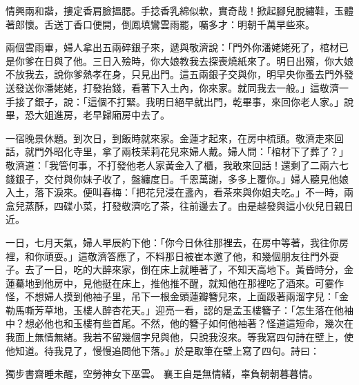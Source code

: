 情興兩和諧，摟定香肩臉搵腮。手捻香乳綿似軟，實奇哉！掀起腳兒脫繡鞋，玉體著郎懷。舌送丁香口便開，倒鳳填鸞雲雨罷，囑多才：明朝千萬早些來。

兩個雲雨畢，婦人拿出五兩碎銀子來，遞與敬濟說：「門外你潘姥姥死了，棺材已是你爹在日與了他。三日入殮時，你大娘教我去探喪燒紙來了。明日出殯，你大娘不放我去，說你爹熱孝在身，只見出門。這五兩銀子交與你，明早央你蚤去門外發送發送你潘姥姥，打發抬錢，看著下入土內，你來家。就同我去一般。」這敬濟一手接了銀子，說：「這個不打緊。我明日絕早就出門，乾畢事，來回你老人家。」說畢，恐大姐進房，老早歸廂房中去了。

一宿晚景休題。到次日，到飯時就來家。金蓮才起來，在房中梳頭。敬濟走來回話，就門外昭化寺里，拿了兩枝茉莉花兒來婦人戴。婦人問：「棺材下了葬了？」敬濟道：「我管何事，不打發他老人家黃金入了櫃，我敢來回話！還剩了二兩六七錢銀子，交付與你妹子收了，盤纏度日。千恩萬謝，多多上覆你。」婦人聽見他娘入土，落下淚來。便叫春梅：「把花兒浸在盞內，看茶來與你姐夫吃。」不一時，兩盒兒蒸酥，四碟小菜，打發敬濟吃了茶，往前邊去了。由是越發與這小伙兒日親日近。

一日，七月天氣，婦人早辰約下他：「你今日休往那裡去，在房中等著，我往你房裡，和你頑耍。」這敬濟答應了，不料那日被崔本邀了他，和幾個朋友往門外耍子。去了一日，吃的大醉來家，倒在床上就睡著了，不知天高地下。黃昏時分，金蓮驀地到他房中，見他挺在床上，推他推不醒，就知他在那裡吃了酒來。可霎作怪，不想婦人摸到他袖子里，吊下一根金頭蓮瓣簪兒來，上面趿著兩溜字兒：「金勒馬嘶芳草地，玉樓人醉杏花天。」迎亮一看，認的是孟玉樓簪子：「怎生落在他袖中？想必他也和玉樓有些首尾。不然，他的簪子如何他袖著？怪道這短命，幾次在我面上無情無緒。我若不留幾個字兒與他，只說我沒來。等我寫四句詩在壁上，使他知道。待我見了，慢慢追問他下落。」於是取筆在壁上寫了四句。詩曰：

獨步書齋睡未醒，空勞神女下巫雲。
襄王自是無情緒，辜負朝朝暮暮情。

